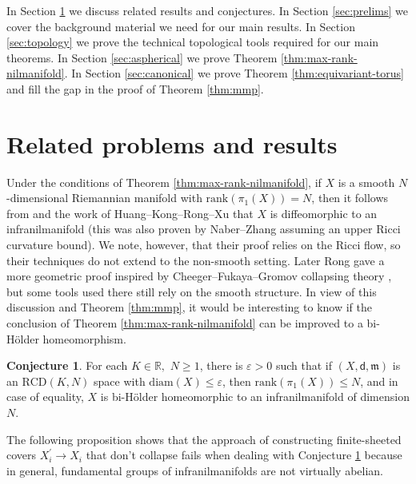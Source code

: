 \documentclass[12pt]{amsart}
\theoremstyle{definition}
\def\fnum{equation}
\newtheorem{conjecture}[\fnum]{Conjecture}
\numberwithin{equation}{section}
\newcommand{\rank}{{\text{rank}}}
\newcommand{\diam}{{\text {diam}}}
\newcommand{\rcd}{\text{RCD}}
\newcommand{\mm}{\mathfrak{m}}
\begin{document}
In Section \ref{sec:discussion} we discuss related results and conjectures. In Section \ref{sec:prelims} we cover the background material we need for our main results. In  Section \ref{sec:topology} we prove the technical topological tools required for our main theorems. In Section \ref{sec:aspherical} we prove Theorem \ref{thm:max-rank-nilmanifold}.   In Section \ref{sec:canonical} we prove Theorem \ref{thm:equivariant-torus} and  fill the gap in the proof of Theorem \ref{thm:mmp}.






\section{Related problems and results}\label{sec:discussion}


\color{black}


Under the conditions of Theorem \ref{thm:max-rank-nilmanifold}, if $X$ is a smooth $N$-dimensional Riemannian manifold with $\rank (\pi_1(X)) = N$, then it follows from \cite[Proposition 5.4]{naber-zhang} and the work of Huang--Kong--Rong--Xu \cite{huang-kong-rong-xu} that $X$ is diffeomorphic to an infranilmanifold (this was also proven by Naber--Zhang \cite{naber-zhang} assuming an upper Ricci curvature bound). We note, however, that their proof relies on the Ricci flow, so their techniques do not extend to the non-smooth setting. Later Rong \cite{rong} gave a more geometric proof inspired by Cheeger--Fukaya--Gromov collapsing theory \cite{cheeger-fukaya-gromov}, but some tools used there still rely on the smooth structure. In view of this discussion and Theorem \ref{thm:mmp}, it would be interesting to know if the conclusion of  Theorem \ref{thm:max-rank-nilmanifold} can be improved to a bi-H\"older homeomorphism. 

\begin{conjecture}\label{con:bi-holder}
   For each $K \in \mathbb{R},$ $ N\geq 1  $, there is $\varepsilon > 0$ such that if $(X,\mathsf{d} ,  \mm ) $ is an $\rcd (K,N)$ space with $\diam (X) \leq \varepsilon $, then $ \rank (\pi_1(X))  \leq N $, and in case of equality, $X$ is bi-H\"older homeomorphic to an infranilmanifold of dimension $N$.  
\end{conjecture}



The following proposition shows that the approach of constructing finite-sheeted covers $X_i^{\prime} \to X_i$ that don't collapse fails when dealing with Conjecture  \ref{con:bi-holder} because in general, fundamental groups of infranilmanifolds are not virtually abelian.
\end{document}
